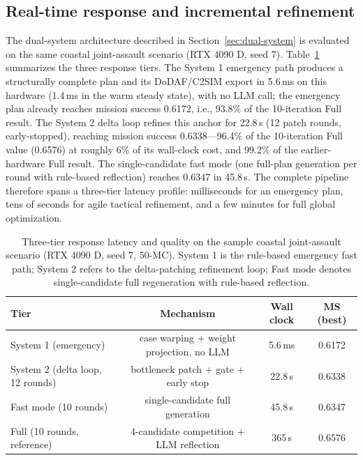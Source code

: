 \subsection{Real-time response and incremental refinement}

The dual-system architecture described in Section~\ref{sec:dual-system} is evaluated on the same coastal joint-assault scenario (RTX 4090 D, seed 7). Table~\ref{tab:latency-matrix} summarizes the three response tiers. The System 1 emergency path produces a structurally complete plan and its DoDAF/C2SIM export in 5.6\,ms on this hardware (1.4\,ms in the warm steady state), with no LLM call; the emergency plan already reaches mission success 0.6172, i.e., 93.8\% of the 10-iteration Full result. The System 2 delta loop refines this anchor for 22.8\,s (12 patch rounds, early-stopped), reaching mission success 0.6338---96.4\% of the 10-iteration Full value (0.6576) at roughly 6\% of its wall-clock cost, and 99.2\% of the earlier-hardware Full result. The single-candidate fast mode (one full-plan generation per round with rule-based reflection) reaches 0.6347 in 45.8\,s. The complete pipeline therefore spans a three-tier latency profile: milliseconds for an emergency plan, tens of seconds for agile tactical refinement, and a few minutes for full global optimization.

\begin{table}[ht]
\centering
\caption{Three-tier response latency and quality on the sample coastal joint-assault scenario (RTX 4090 D, seed 7, 50-MC). System 1 is the rule-based emergency fast path; System 2 refers to the delta-patching refinement loop; Fast mode denotes single-candidate full regeneration with rule-based reflection.}
\label{tab:latency-matrix}
\small
\setlength{\tabcolsep}{4pt}
\begin{tabular}{lccc}
\toprule
Tier & Mechanism & Wall clock & MS (best) \\
\midrule
System 1 (emergency) & case warping + weight projection, no LLM & 5.6\,ms & 0.6172 \\
System 2 (delta loop, 12 rounds) & bottleneck patch + gate + early stop & 22.8\,s & 0.6338 \\
Fast mode (10 rounds) & single-candidate full generation & 45.8\,s & 0.6347 \\
Full (10 rounds, reference) & 4-candidate competition + LLM reflection & 365\,s & 0.6576 \\
\bottomrule
\end{tabular}
\end{table}

